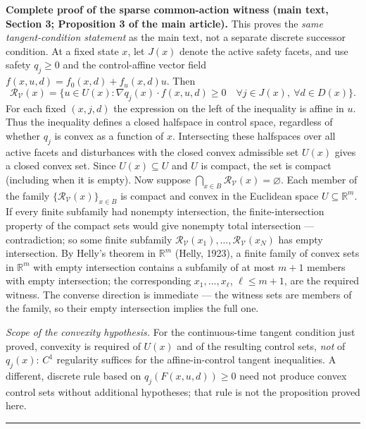 \documentclass[11pt]{article}
\theoremstyle{definition}
\begin{document}
\bigskip
\noindent\textbf{Complete proof of the sparse common-action witness
(main text, Section 3; Proposition 3 of the main article).}
This proves the \emph{same tangent-condition statement} as the main
text, not a separate discrete successor condition. At a fixed state
\(x\), let \(J(x)\) denote the active safety facets, and use safety
\(q_j\ge0\) and the control-affine vector field
\(f(x,u,d)=f_0(x,d)+f_u(x,d)u\). Then
\[\mathcal R_{\mathcal V}(x)=\{u\in U(x):
\nabla q_j(x)\cdot f(x,u,d)\ge0\quad
\forall j\in J(x),\ \forall d\in D(x)\}.\]
For each fixed \((x,j,d)\) the expression on the left of the
inequality is affine in \(u\). Thus the inequality defines a closed
halfspace in control space, regardless of whether \(q_j\) is convex
as a function of \(x\). Intersecting these halfspaces over all active
facets and disturbances with the closed convex admissible set \(U(x)\)
gives a closed convex set. Since \(U(x)\subseteq U\) and \(U\) is
compact, the set is compact (including when it is empty). Now suppose
\(\bigcap_{x\in B}\mathcal R_{\mathcal V}(x)=\varnothing\).
Each member of the family \(\{\mathcal{R}_{\mathcal{V}}(x)\}_{x \in B}\)
is compact and convex in the Euclidean space \(U \subseteq
\mathbb{R}^{m}\). If every finite subfamily had nonempty intersection,
the finite-intersection property of the compact sets would give nonempty
total intersection --- contradiction; so some finite subfamily
\(\mathcal{R}_{\mathcal{V}}(x_{1}), \dots,
\mathcal{R}_{\mathcal{V}}(x_{N})\) has empty intersection. By Helly's
theorem in \(\mathbb{R}^{m}\) (Helly, 1923), a finite family of convex
sets in \(\mathbb{R}^{m}\) with empty intersection contains a
subfamily of at most \(m + 1\) members with empty intersection; the
corresponding \(x_{1}, \dots, x_{\ell}\), \(\ell \le m + 1\), are the
required witness. The converse direction is immediate --- the witness
sets are members of the family, so their empty intersection implies the
full one. \smallskip

\emph{Scope of the convexity hypothesis.} For the continuous-time
tangent condition just proved, convexity is required of \(U(x)\)
and of the resulting control sets, \emph{not} of \(q_j(x)\):
\(C^1\) regularity suffices for the affine-in-control tangent
inequalities. A different, discrete rule based on
\(q_j(F(x,u,d))\ge0\) need not produce convex control sets without
additional hypotheses; that rule is not the proposition proved here.
\rule{0.5\linewidth}{0.5pt}
\end{document}
